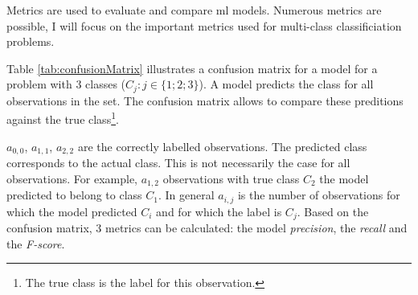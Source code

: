 Metrics are used to evaluate and compare \acrlong{ml} models.
Numerous metrics are possible, I will focus on the important metrics used for multi-class classificiation problems.

Table \ref{tab:confusionMatrix} illustrates a confusion matrix for a model for a problem with 3 classes ($C_j:j\in \{1;2;3\}$). 
A model predicts the class for all observations in the set.
The confusion matrix allows to compare these preditions against the true class\footnote{The true class is the label for this observation.}.

$a_{0,0}$, $a_{1,1}$, $a_{2,2}$ are the correctly labelled observations. 
The predicted class corresponds to the actual class.
This is not necessarily the case for all observations. For example, $a_{1,2}$ observations with true class $C_2$ the model predicted to belong to class $C_1$.
In general $a_{i,j}$ is the number of observations for which the model predicted $C_i$ and for which the label is $C_j$.
Based on the confusion matrix, 3 metrics can be calculated: the model \textit{precision}, the \textit{recall} and the \textit{F-score}.\newline

